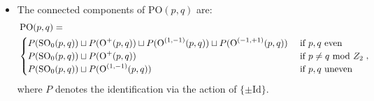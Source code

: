 \documentclass{report}
\begin{document}
\begin{itemize}
    \item
        The connected components of $\mathrm{PO}(p,q)$ are:
        \begin{align*}
            &\operatorname{{\mathrm{PO}}}(p,q) = \\
            &\begin{cases}
                 P(\operatorname{{\mathrm{SO}}}_0(p,q)) \sqcup  P(\operatorname{{\mathrm{O}}}^+(p,q)) \sqcup  P(\operatorname{{\mathrm{O}}}^{(1,-1)}(p,q)) \sqcup  P(\operatorname{{\mathrm{O}}}^{(-1,+1)}(p,q)) & \text{ if } p, q \text{ even} \\
                 P (\operatorname{{\mathrm{SO}}}_0(p,q)) \sqcup  P(\operatorname{{\mathrm{O}}}^+(p,q)) & \text{ if } p\neq q\  \mathrm{mod}\  Z_2 \\
                 P(\operatorname{{\mathrm{SO}}}_0(p,q)) \sqcup  P(\operatorname{{\mathrm{O}}}^{(1,-1)}(p,q)) & \text{ if } p, q \text{ uneven}
            \end{cases},
        \end{align*}
        where $P$ denotes the identification via the action of $\{\pm \mathrm{Id}\}$.
            
            
            

\end{itemize}
\end{document}
